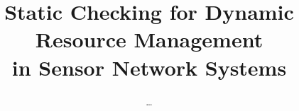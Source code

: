 \documentclass{llncs}
\begin{document}
\title{Static Checking for Dynamic Resource Management \\ in Sensor
  Network Systems}


\author{\ldots}

\institute{\ldots}


\maketitle









{


}
\end{document}
